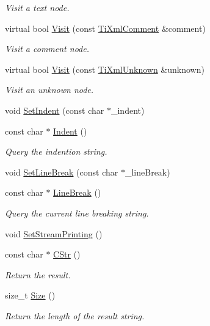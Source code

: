 \begin{DoxyCompactItemize}
\begin{DoxyCompactList}\small\item\em Visit a text node. \end{DoxyCompactList}\item 
virtual bool \hyperlink{class_ti_xml_printer_a9870423f5603630e6142f6bdb66dfb57}{Visit} (const \hyperlink{class_ti_xml_comment}{Ti\+Xml\+Comment} \&comment)
\begin{DoxyCompactList}\small\item\em Visit a comment node. \end{DoxyCompactList}\item 
virtual bool \hyperlink{class_ti_xml_printer_a08591a15c9a07afa83c24e08b03d6358}{Visit} (const \hyperlink{class_ti_xml_unknown}{Ti\+Xml\+Unknown} \&unknown)
\begin{DoxyCompactList}\small\item\em Visit an unknown node. \end{DoxyCompactList}\item 
void \hyperlink{class_ti_xml_printer_a213377a4070c7e625bae59716b089e5e}{Set\+Indent} (const char $\ast$\+\_\+indent)
\item 
const char $\ast$ \hyperlink{class_ti_xml_printer_abb33ec7d4bad6aaeb57f4304394b133d}{Indent} ()
\begin{DoxyCompactList}\small\item\em Query the indention string. \end{DoxyCompactList}\item 
void \hyperlink{class_ti_xml_printer_a4be1e37e69e3858c59635aa947174fe6}{Set\+Line\+Break} (const char $\ast$\+\_\+line\+Break)
\item 
const char $\ast$ \hyperlink{class_ti_xml_printer_a11f1b4804a460b175ec244eb5724d96d}{Line\+Break} ()
\begin{DoxyCompactList}\small\item\em Query the current line breaking string. \end{DoxyCompactList}\item 
void \hyperlink{class_ti_xml_printer_ab23a90629e374cb1cadca090468bbd19}{Set\+Stream\+Printing} ()
\item 
const char $\ast$ \hyperlink{class_ti_xml_printer_a859eede9597d3e0355b77757be48735e}{C\+Str} ()
\begin{DoxyCompactList}\small\item\em Return the result. \end{DoxyCompactList}\item 
size\+\_\+t \hyperlink{class_ti_xml_printer_ad01375ae9199bd2f48252eaddce3039d}{Size} ()
\begin{DoxyCompactList}\small\item\em Return the length of the result string. \end{DoxyCompactList}\end{DoxyCompactItemize}


